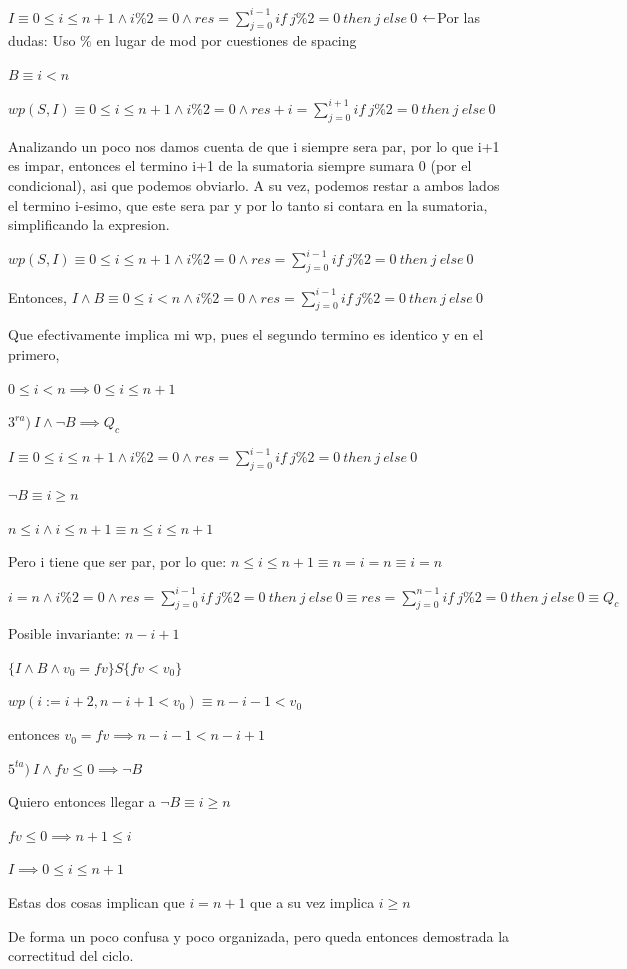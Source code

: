 \documentclass[a4paper,10pt]{article}
\begin{document}
    \salto{\baselineskip}

$I\equiv 0\leq i\leq n+1 \land i\%2=0 \land res=\sum_{j=0}^{i-1}if\ j\%2 = 0\ then\ j\ else\ 0$ {\small {\color{Violet}$\hfill \leftarrow$Por las dudas: Uso $\%$ en lugar de mod por cuestiones de spacing}}

$B\equiv i<n$

$wp(S,I)\equiv 0\leq i\leq n+1 \land i\%2=0 \land res+i=\sum_{j=0}^{i+1}if\ j\%2 = 0\ then\ j\ else\ 0$

Analizando un poco nos damos cuenta de que i siempre sera par, por lo que i+1 es impar, entonces el termino i+1 de la sumatoria siempre sumara 0 (por el condicional), asi que podemos obviarlo. A su vez, podemos restar a ambos lados el termino i-esimo, que este sera par y por lo tanto si contara en la sumatoria, simplificando la expresion.

$wp(S,I)\equiv 0\leq i\leq n+1 \land i\%2=0 \land res=\sum_{j=0}^{i-1}if\ j\%2 = 0\ then\ j\ else\ 0$

Entonces, $I\land B \equiv 0\leq i<n \land i\%2=0 \land res=\sum_{j=0}^{i-1}if\ j\%2 = 0\ then\ j\ else\ 0$

Que efectivamente implica mi wp, pues el segundo termino es identico y en el primero,

$0\leq i<n\implies 0\leq i\leq n+1$

\salto{\baselineskip}

$3^{ra})\ I\land\lnot B\implies Q_c$

$I\equiv 0\leq i\leq n+1 \land i\%2=0 \land res=\sum_{j=0}^{i-1}if\ j\%2 = 0\ then\ j\ else\ 0$

$\lnot B\equiv i\geq n$

$n\leq i \land i\leq n+1\equiv n\leq i\leq n+1$

Pero i tiene que ser par, por lo que: $n\leq i\leq n+1\equiv n=i=n \equiv i=n$

$i=n \land i\%2=0 \land res=\sum_{j=0}^{i-1}if\ j\%2 = 0\ then\ j\ else\ 0 \equiv res=\sum_{j=0}^{n-1}if\ j\%2 = 0\ then\ j\ else\ 0 \equiv Q_c$

Posible invariante: $n-i+1$

$\{I\land B\land v_0=fv\} S \{fv<v_0\}$

$wp(i:=i+2, n-i+1<v_0)\equiv n-i-1<v_0$

entonces $v_0=fv \implies n-i-1<n-i+1$

$5^{ta})\ I\land fv\leq 0 \implies \lnot B$

Quiero entonces llegar a $\lnot B \equiv i\geq n$

$fv\leq 0 \implies n+1\leq i$

$I\implies 0\leq i\leq n+1$

Estas dos cosas implican que $i=n+1$ que a su vez implica $i\geq n$

De forma un poco confusa y poco organizada, pero queda entonces demostrada la correctitud del ciclo.
\pagebreak
\end{document}
